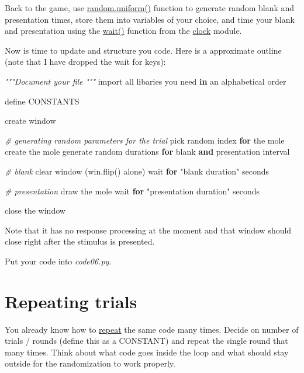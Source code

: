 \documentclass[
]{book}
\newenvironment{Shaded}{\begin{snugshade}}{\end{snugshade}}
\newcommand{\BuiltInTok}[1]{#1}
\newcommand{\CommentTok}[1]{\textcolor[rgb]{0.56,0.35,0.01}{\textit{#1}}}
\newcommand{\ControlFlowTok}[1]{\textcolor[rgb]{0.13,0.29,0.53}{\textbf{#1}}}
\newcommand{\ImportTok}[1]{#1}
\newcommand{\KeywordTok}[1]{\textcolor[rgb]{0.13,0.29,0.53}{\textbf{#1}}}
\newcommand{\NormalTok}[1]{#1}
\newcommand{\StringTok}[1]{\textcolor[rgb]{0.31,0.60,0.02}{#1}}
\begin{document}
Back to the game, use \href{https://docs.python.org/3/library/random.html\#random.uniform}{random.uniform()} function to generate random blank and presentation times, store them into variables of your choice, and time your blank and presentation using the \href{https://psychopy.org/api/clock.html\#psychopy.clock.wait}{wait()} function from the \href{https://psychopy.org/api/clock.html}{clock} module.

Now is time to update and structure you code. Here is a approximate outline (note that I have dropped the wait for keys):

\begin{Shaded}
\begin{Highlighting}[]
\CommentTok{"""Document your file}
\CommentTok{"""}
\ImportTok{import} \BuiltInTok{all}\NormalTok{ libaries you need }\KeywordTok{in}\NormalTok{ an alphabetical order}

\NormalTok{define CONSTANTS}

\NormalTok{create window}

\CommentTok{\# generating random parameters for the trial}
\NormalTok{pick random index }\ControlFlowTok{for}\NormalTok{ the mole}
\NormalTok{create the mole}
\NormalTok{generate random durations }\ControlFlowTok{for}\NormalTok{ blank }\KeywordTok{and}\NormalTok{ presentation interval}

\CommentTok{\# blank}
\NormalTok{clear window (win.flip() alone)}
\NormalTok{wait }\ControlFlowTok{for} \StringTok{"blank duration"}\NormalTok{ seconds}

\CommentTok{\# presentation}
\NormalTok{draw the mole}
\NormalTok{wait }\ControlFlowTok{for} \StringTok{"presentation duration"}\NormalTok{ seconds}

\NormalTok{close the window}
\end{Highlighting}
\end{Shaded}

Note that it has no response processing at the moment and that window should close right after the stimulus is presented.

Put your code into \emph{code06.py}.

\hypertarget{repeating-trials}{%
\section{Repeating trials}\label{repeating-trials}}

You already know how to \protect\hyperlink{range}{repeat} the same code many times. Decide on number of trials / rounds (define this as a CONSTANT) and repeat the single round that many times. Think about what code goes inside the loop and what should stay outside for the randomization to work properly.
\end{document}
